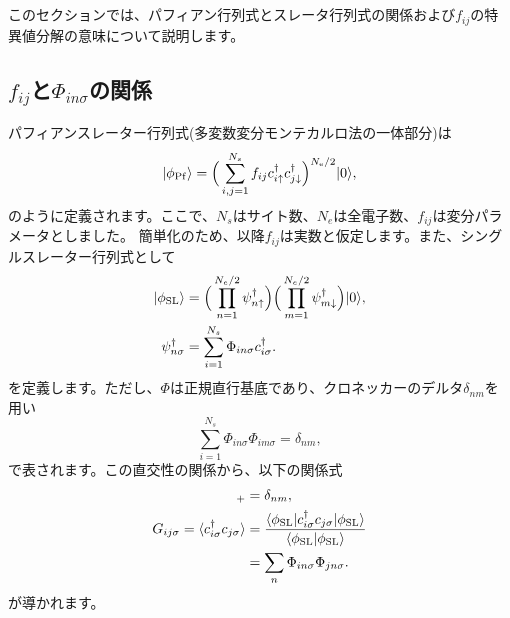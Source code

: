 \section{}
このセクションでは、パフィアン行列式とスレータ行列式の関係および$f_{ij}$の特異値分解の意味について説明します。
\subsection{$f_{ij}$と$\Phi_{in\sigma}$の関係}
パフィアンスレーター行列式(多変数変分モンテカルロ法の一体部分)は
\begin{equation}
|\phi_{\rm Pf}\rangle=\Big(\sum_{i,j=1}^{N_{s}}f_{ij}c_{i\uparrow}^{\dagger}c_{j\downarrow}^{\dagger}\Big)^{N_{\rm e}/2}|0\rangle,
\end{equation}
のように定義されます。ここで、$N_{s}$はサイト数、$N_{e}$は全電子数、$f_{ij}$は変分パラメータとしました。
簡単化のため、以降$f_{ij}$は実数と仮定します。また、シングルスレーター行列式として
\begin{align}
|\phi_{\rm SL}\rangle&=\Big(\prod_{n=1}^{N_{e}/2}\psi_{n\uparrow}^{\dagger}\Big)
\Big(\prod_{m=1}^{N_{e}/2}\psi_{m\downarrow}^{\dagger}\Big)|0\rangle, \\
\psi_{n\sigma}^{\dagger}&=\sum_{i=1}^{N_{s}}\Phi_{in\sigma}c^{\dagger}_{i\sigma}.
\end{align}
を定義します。ただし、$\Phi$は正規直行基底であり、クロネッカーのデルタ$\delta_{nm}$を用い
\begin{equation}
\sum_{i=1}^{N_{s}}\Phi_{in\sigma}\Phi_{im\sigma}=\delta_{nm},
\end{equation}
で表されます。この直交性の関係から、以下の関係式
\begin{align}
[\psi^{\dagger}_{n\sigma},\psi_{m\sigma}]_{+}&=\delta_{nm},\\
G_{ij\sigma}=\langle c_{i\sigma}^{\dagger}c_{j\sigma}\rangle 
&=\frac{\langle \phi_{\rm SL}| c_{i\sigma}^{\dagger}c_{j\sigma} | \phi_{\rm SL}\rangle}{\langle \phi_{\rm SL}|\phi_{\rm SL}\rangle } \\
&=\sum_{n} \Phi_{in\sigma} \Phi_{jn\sigma}.
\end{align}
が導かれます。

